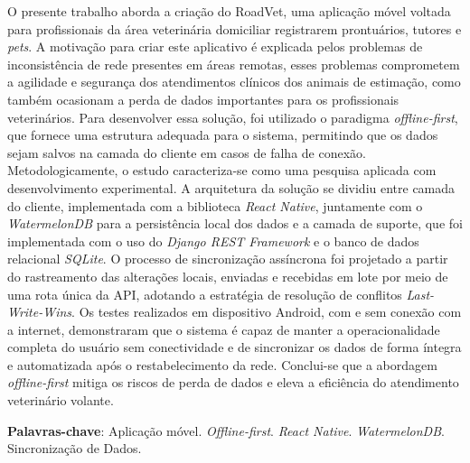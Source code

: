 O presente trabalho aborda a criação do RoadVet, uma aplicação móvel voltada para profissionais da área veterinária domiciliar registrarem prontuários, tutores e \textit{pets}. A motivação para criar este aplicativo é explicada pelos problemas de inconsistência de rede presentes em áreas remotas, esses problemas comprometem a agilidade e segurança dos atendimentos clínicos dos animais de estimação, como também ocasionam a perda de dados importantes para os profissionais veterinários. Para desenvolver essa solução, foi utilizado o paradigma \textit{offline-first}, que fornece uma estrutura adequada para o sistema, permitindo que os dados sejam salvos na camada do cliente em casos de falha de conexão. Metodologicamente, o estudo caracteriza-se como uma pesquisa aplicada com desenvolvimento experimental. A arquitetura da solução se dividiu entre camada do cliente, implementada com a biblioteca \textit{React Native}, juntamente com o \textit{WatermelonDB} para a persistência local dos dados e a camada de suporte, que foi implementada com o uso do \textit{Django REST Framework} e o banco de dados relacional \textit{SQLite}. O processo de sincronização assíncrona foi projetado a partir do rastreamento das alterações locais, enviadas e recebidas em lote por meio de uma rota única da API, adotando a estratégia de resolução de conflitos \textit{Last-Write-Wins}. Os testes realizados em dispositivo Android, com e sem conexão com a internet, demonstraram que o sistema é capaz de manter a operacionalidade completa do usuário sem conectividade e de sincronizar os dados de forma íntegra e automatizada após o restabelecimento da rede. Conclui-se que a abordagem \textit{offline-first} mitiga os riscos de perda de dados e eleva a eficiência do atendimento veterinário volante.

\noindent\textbf{Palavras-chave}: Aplicação móvel. \textit{Offline-first}. \textit{React Native}. \textit{WatermelonDB}. Sincronização de Dados.

